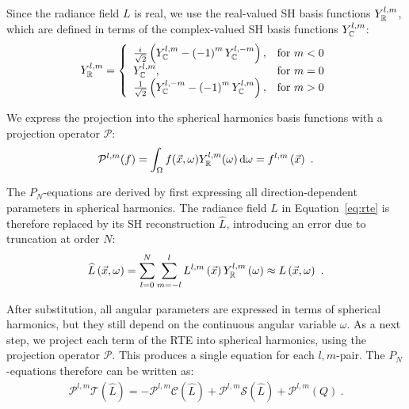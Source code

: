 Since the radiance field $L$ is real, we use the real-valued SH basis functions $Y_{\mathbb{R}}^{l,m}$, which are defined in terms of the complex-valued SH basis functions $Y_{\mathbb{C}}^{l,m}$:
\begin{align}
Y_{\mathbb{R}}^{l,m}=
\left\{
\begin{array}{lr}
\frac{{i\mkern1mu}}{\sqrt{2}}\left(Y_{\mathbb{C}}^{l,m}-\left(-1\right)^mY_{\mathbb{C}}^{l,-m}\right), & \text{for } m < 0\\
Y_{\mathbb{C}}^{l,m}, & \text{for } m = 0\\
\frac{1}{\sqrt{2}}\left(Y_{\mathbb{C}}^{l,-m}-\left(-1\right)^mY_{\mathbb{C}}^{l,m}\right), & \text{for } m > 0
\end{array}
\right.
\label{eq:sh_real_basis}
\end{align}

We express the projection into the spherical harmonics basis functions with a projection operator $\mathcal{P}$:
\begin{align}
\mathcal{P}^{l, m}(f) = \int_{\Omega}f(\vec{x}, \omega) Y_{\mathbb{R}}^{l,m}(\omega)\,\mathrm{d}\omega = f^{l,m}\left(\vec{x}\right)
\ .
\nonumber
\end{align}

The $P_N$-equations are derived by first expressing all direction-dependent parameters in spherical harmonics. The radiance field $L$ in Equation~\ref{eq:rte} is therefore replaced by its SH reconstruction $\widehat{L}$, introducing an error due to truncation at order $N$:
\begin{align}
\widehat{L}\left(\vec{x}, \omega\right) =
\sum_{l=0}^{N}
{
\sum_{m=-l}^{l}
{
L^{l,m}\left(\vec{x}\right)Y_{\mathbb{R}}^{l,m}\left(\omega\right)
}
}
\approx
L\left(\vec{x}, \omega\right)
\ .
\nonumber
\end{align}

\vspace{0.5in}

After substitution, all angular parameters are expressed in terms of spherical harmonics, but they still depend on the continuous angular variable $\omega$. As a next step, we project each term of the RTE into spherical harmonics, using the projection operator $\mathcal{P}$. This produces a single equation for each $l,m$-pair. The $P_N$-equations therefore can be written as:
\begin{align}
\mathcal{P}^{l,m}\mathcal{T}\left(\widehat{L}\right)
=
-\mathcal{P}^{l,m}\mathcal{C}\left(\widehat{L}\right) 
+\mathcal{P}^{l,m}\mathcal{S}\left(\widehat{L}\right)
+\mathcal{P}^{l,m}\left(Q\right)
\ .
\label{eq:pn_operator_notation}
\end{align}

